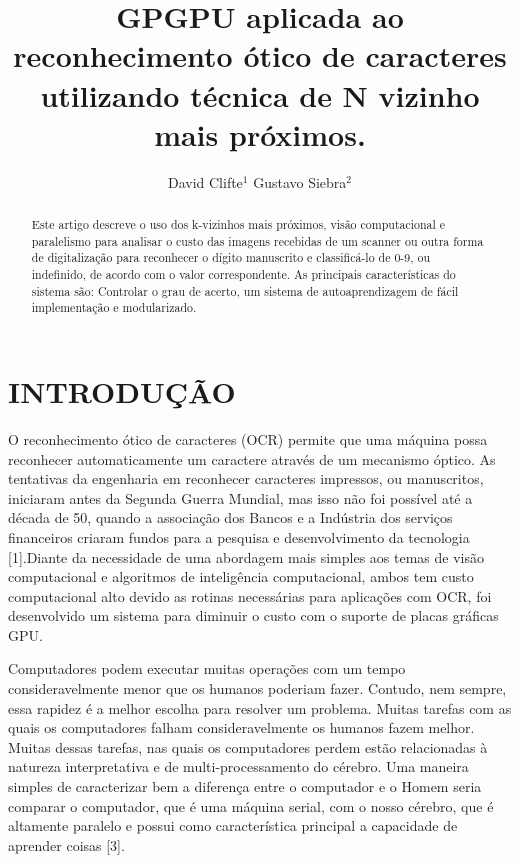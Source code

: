 \documentclass[letterpaper, 10 pt, conference]{ieeeconf}  %
\title{\LARGE \bf
GPGPU aplicada ao reconhecimento ótico de caracteres utilizando técnica de N vizinho mais próximos.
}
\author{David Clifte$^{1}$  Gustavo Siebra$^{2}$%
}
\begin{document}
\maketitle
\thispagestyle{empty}
\pagestyle{empty}


\begin{abstract}

Este artigo descreve o uso dos k-vizinhos mais próximos, visão computacional e paralelismo para
analisar o custo das imagens recebidas de um scanner ou outra forma de digitalização
para reconhecer o dígito manuscrito e classificá-lo de 0-9, ou indefinido, de acordo com
o valor correspondente. As principais características do sistema são: Controlar o grau
de acerto, um sistema de autoaprendizagem de fácil implementação e modularizado.

\end{abstract}


\section{INTRODUÇÃO}

O reconhecimento ótico de caracteres (OCR) permite que uma máquina possa
reconhecer automaticamente um caractere através de um mecanismo óptico. As tentativas
da engenharia em reconhecer caracteres impressos, ou manuscritos, iniciaram antes da
Segunda Guerra Mundial, mas isso não foi possível até a década de 50, quando a associação
dos Bancos e a Indústria dos serviços financeiros criaram fundos para a pesquisa e
desenvolvimento da tecnologia [1].Diante da necessidade de uma abordagem mais simples
aos temas de visão computacional e algoritmos de inteligência computacional, ambos tem
custo computacional alto devido as rotinas necessárias para aplicações com OCR, foi
desenvolvido um sistema para diminuir o custo com o suporte de placas gráficas GPU.

Computadores podem executar muitas operações com um tempo consideravelmente
menor que os humanos poderiam fazer. Contudo, nem sempre, essa rapidez é a melhor
escolha para resolver um problema. Muitas tarefas com as quais os computadores falham
consideravelmente os humanos fazem melhor. Muitas dessas tarefas, nas quais os computadores
perdem estão relacionadas à natureza interpretativa e de multi-processamento do
cérebro. Uma maneira simples de caracterizar bem a diferença entre o computador e o
Homem seria comparar o computador, que é uma máquina serial, com o nosso cérebro,
que é altamente paralelo e possui como característica principal a capacidade de aprender
coisas [3].
\end{document}
